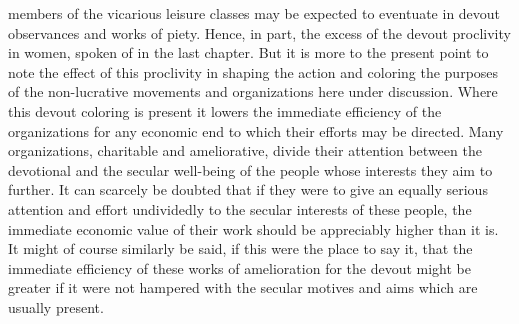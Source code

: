 \documentclass[12pt]{report}
\begin{document}
members of the vicarious leisure classes may be expected to eventuate in
devout observances and works of piety. Hence, in part, the excess of
the devout proclivity in women, spoken of in the last chapter. But it
is more to the present point to note the effect of this proclivity
in shaping the action and coloring the purposes of the non-lucrative
movements and organizations here under discussion. Where this
devout coloring is present it lowers the immediate efficiency of
the organizations for any economic end to which their efforts may be
directed. Many organizations, charitable and ameliorative, divide their
attention between the devotional and the secular well-being of the
people whose interests they aim to further. It can scarcely be doubted
that if they were to give an equally serious attention and effort
undividedly to the secular interests of these people, the immediate
economic value of their work should be appreciably higher than it is.
It might of course similarly be said, if this were the place to say it,
that the immediate efficiency of these works of amelioration for the
devout might be greater if it were not hampered with the secular motives
and aims which are usually present.
\end{document}
